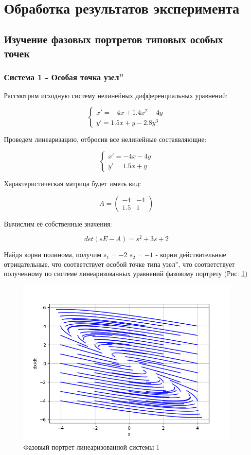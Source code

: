 \section{Обработка результатов эксперимента}

\subsection{Изучение фазовых портретов типовых особых точек}

\subsubsection{Система 1 - Особая точка  узел\textquotedblright}

Рассмотрим исходную систему нелинейных дифференциальных уравнений:

$$
\begin{cases}
x' = -4x + 1.4x^2 - 4y \\
y' = 1.5x + y - 2.8y^3
\end{cases}
$$

Проведем линеаризацию, отбросив все нелинейные состаявляющие:

$$
\begin{cases}
x' = -4x - 4y \\
y' = 1.5x + y
\end{cases}
$$

Характеристическая матрица будет иметь вид:

$$
A = 
\begin{pmatrix}
	-4 & -4 \\
	1.5 & 1
\end{pmatrix}
$$

Вычислим её собственные значения:

$$
det(sE - A) = s^2 + 3s + 2
$$

Найдя корни полинома, получим $s_1 = -2$ $s_2 = -1$ - корни действительные отрицательные, 
что соответствует особой точке типа  узел\textquotedblright, 
что соответствует полученному по системе линеаризованных уравнений фазовому портрету (Рис. \ref{fig:1})

\begin{figure}[H]
	\centering
	\includegraphics[width=0.6\linewidth]{body/images/Linearized-system-1.png}
	\caption{Фазовый портрет линеаризованной системы 1}
	\label{fig:1}
\end{figure}


